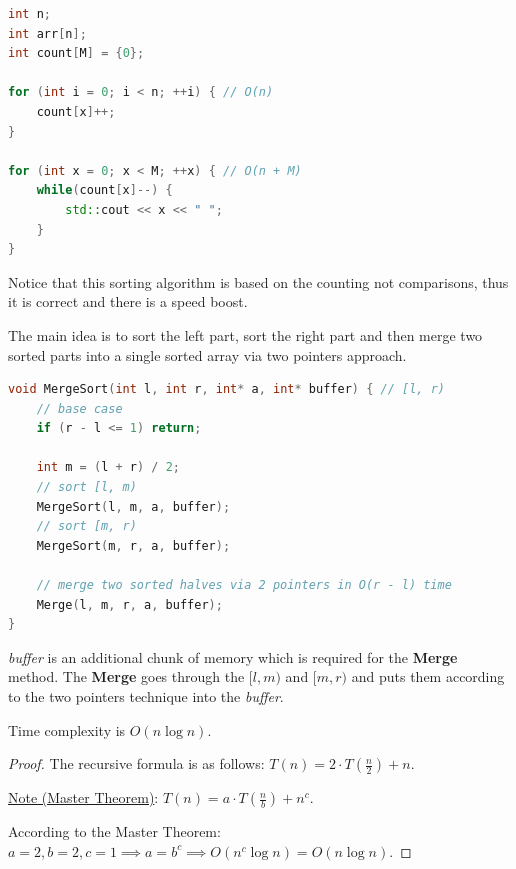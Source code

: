 \begin{lstlisting}[language=C++]
int n;
int arr[n];
int count[M] = {0};

for (int i = 0; i < n; ++i) { // O(n)
    count[x]++;
}

for (int x = 0; x < M; ++x) { // O(n + M)
    while(count[x]--) {
        std::cout << x << " ";
    }
}

\end{lstlisting}

Notice that this sorting algorithm is based on the counting not comparisons, thus it is correct and there is a speed boost.



The main idea is to sort the left part, sort the right part and then merge two sorted parts into a single sorted array via two pointers approach.


\begin{lstlisting}[language=C++]
void MergeSort(int l, int r, int* a, int* buffer) { // [l, r)
    // base case
    if (r - l <= 1) return;

    int m = (l + r) / 2;
    // sort [l, m)
    MergeSort(l, m, a, buffer);
    // sort [m, r)
    MergeSort(m, r, a, buffer);

    // merge two sorted halves via 2 pointers in O(r - l) time
    Merge(l, m, r, a, buffer);
}
\end{lstlisting}

\textit{buffer} is an additional chunk of memory which is required for the \textbf{Merge} method. The \textbf{Merge} goes through the $[l, m)$ and $[m, r)$ and puts them according to the two pointers technique into the \textit{buffer}.

\begin{lemma}

    Time complexity is $O(n \log{n})$.

\end{lemma}

\begin{proof}
    The recursive formula is as follows: $T(n) = 2 \cdot T(\frac{n}{2}) + n$.

    \underline{Note (Master Theorem)}: $T(n) = a \cdot T(\frac{n}{b}) + n^c$.

    According to the Master Theorem: $a = 2, b = 2, c = 1 \implies a = b^c \implies O(n^c \log{n}) = O(n \log{n})$.

\end{proof}


